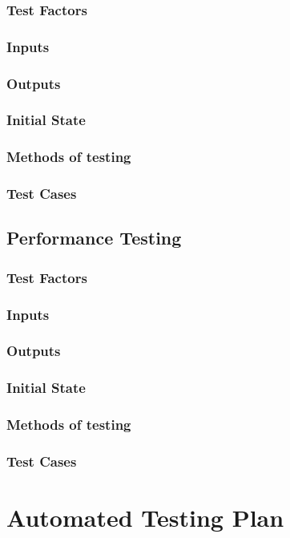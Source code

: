 \documentclass[12pt]{article}
\begin{document}
\subsubsection{Test Factors}
\subsubsection{Inputs}
\subsubsection{Outputs}
\subsubsection{Initial State}
\subsubsection{Methods of testing}
\subsubsection{Test Cases}

\subsection{Performance Testing}
\subsubsection{Test Factors}
\subsubsection{Inputs}
\subsubsection{Outputs}
\subsubsection{Initial State}
\subsubsection{Methods of testing}
\subsubsection{Test Cases}

\section{Automated Testing Plan}
\end{document}
